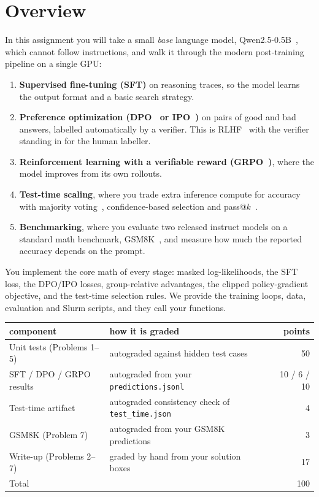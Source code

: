 \documentclass[11pt]{article}
\newcommand{\file}[1]{\texttt{#1}}
\begin{document}
\section*{Overview}
In this assignment you will take a small \emph{base} language model, Qwen2.5-0.5B~\cite{qwen25}, which cannot
follow instructions, and walk it through the modern post-training pipeline on a single GPU:
\begin{enumerate}
  \item \textbf{Supervised fine-tuning (SFT)} on reasoning traces, so the model learns the output format and a
        basic search strategy.
  \item \textbf{Preference optimization (DPO~\cite{dpo} or IPO~\cite{ipo})} on pairs of good and bad answers,
        labelled automatically by a verifier. This is RLHF~\cite{instructgpt} with the verifier standing in for
        the human labeller.
  \item \textbf{Reinforcement learning with a verifiable reward (GRPO~\cite{deepseekmath})}, where the model
        improves from its own rollouts.
  \item \textbf{Test-time scaling}, where you trade extra inference compute for accuracy with majority
        voting~\cite{selfconsistency}, confidence-based selection and pass@$k$~\cite{codex}.
  \item \textbf{Benchmarking}, where you evaluate two released instruct models on a standard math benchmark,
        GSM8K~\cite{gsm8k}, and measure how much the reported accuracy depends on the prompt.
\end{enumerate}
You implement the core math of every stage: masked log-likelihoods, the SFT loss, the DPO/IPO losses,
group-relative advantages, the clipped policy-gradient objective, and the test-time selection rules. We provide
the training loops, data, evaluation and Slurm scripts, and they call your functions.

\begin{center}
\begin{tabular}{@{}llr@{}}
\toprule
component & how it is graded & points \\
\midrule
Unit tests (Problems 1--5) & autograded against hidden test cases & 50 \\
SFT / DPO / GRPO results & autograded from your \file{predictions.jsonl} & 10 / 6 / 10 \\
Test-time artifact & autograded consistency check of \file{test\_time.json} & 4 \\
GSM8K (Problem 7) & autograded from your GSM8K predictions & 3 \\
Write-up (Problems 2--7) & graded by hand from your solution boxes & 17 \\
\midrule
Total & & 100 \\
\bottomrule
\end{tabular}
\end{center}
\end{document}
